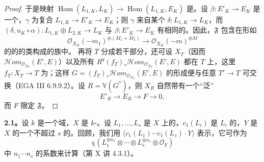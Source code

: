 \begin{proof}
于是映射 $\operatorname{Hom}(L_{1,K},L_K)\to\operatorname{Hom}(L_{1,K},E_K)$ 是。设 $\beta:E'_K\to E_K$ 是一个，$\gamma$ 为复合 $L_{1,K}\to E'_K\to E_K$；则 $\gamma$ 来自某个 $\delta:L_{1,K}\to L_K$，而 $(\delta,u_K\circ\alpha):L_{1,K}\oplus L_{2,K}\to L_K$ 与 $\beta:E'_K\to E_K$ 有相同的。因此，$\mathfrak F$ 包含在形如
\[\mathcal O_{X_K}(-m_1)^{\oplus(M_1+M_2)}\longrightarrow\mathcal O_{X_K}(-m)^{\oplus M}\]
的的的类构成的族中。
再将 $T$ 分成若干部分，还可设 $X_T$（因而 $\mathcal H om_{\mathcal O_{X_T}}(E',E)$）以及所有 $R^q(f_T)_*\mathcal H om_{\mathcal O_{X_T}}(E',E)$ 都在 $T$ 上，这里 $f_T:X_T\to T$ 为；这样 $G=(f_T)_*\mathcal H om_{\mathcal O_{X_T}}(E',E)$ 的形成便与任意 $T'\to T$ 可交换（EGA III 6.9.9.2）。设 $R=\mathbb V(G^*)$，则 $X_R$ 自然带有一个“泛”
\[E'_R\longrightarrow E_R\longrightarrow F\longrightarrow0,\]
而 $F$ 限定 $\mathfrak F$。
\end{proof}
\textbf{2.1。}设 $k$ 是一个域，$X$ 是 $k$-。设 $L_1,\ldots,L_s$ 是 $X$ 上的，$c_1(L_i)$ 是 $L_i$ 的，$Y$ 是 $X$ 的一个不超过 $s$ 的。回顾，我们用
$\langle c_1(L_1)\cdots c_1(L_s)\cdot Y\rangle$ 表示，它可作为 
\[\chi(L_1^{\otimes n_1}\otimes\cdots\otimes L_s^{\otimes n_s}\otimes\mathcal O_Y)\]
中 $n_1\cdots n_s$ 的系数来计算（第 X 讲 4.3.1）。

